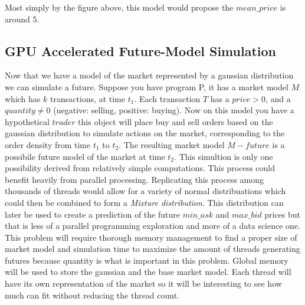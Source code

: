\documentclass[12pt]{article}
\begin{document}



Most simply by the figure above, this model would propose the $mean\_price$ is around 5.

\subsection{GPU Accelerated Future-Model Simulation}
Now that we have a model of the market represented by a gaussian distribution we can simulate a future. Suppose you have program P, it has a market model $M$ which has $k$ transactions, at time $t_1$. 
Each transaction $T$ has a $price > 0$, and a $quantity \neq 0$ (negative: selling, positive: buying). 
Now on this model you have a hypothetical $trader$ this object will place buy and sell orders based on the gaussian distribution to simulate actions on the market, corresponding to the order density from time $t_1$ to $t_2$. 
The resulting market model $M-future$ is a possibile future model of the market at time $t_2$.
This simultion is only one possibility derived from relatively simple computations.
This process could benefit heavily from parallel processing.
Replicating this process among thousands of threads would allow for a variety of normal distribuations which could then be combined to form a \emph{Mixture distribution}.
This distribution can later be used to create a prediction of the future $min\_ask$ and $max\_bid$ prices but that is less of a parallel programming exploration and more of a data science one.
This problem will require thorough memory management to find a proper size of market model and simulation time to maximize the amount of threads generating futures because quantity is what is important in this problem. 
Global memory will be used to store the gaussian and the base market model. 
Each thread will have its own representation of the market so it will be interesting to see how much can fit without reducing the thread count.
\end{document}
